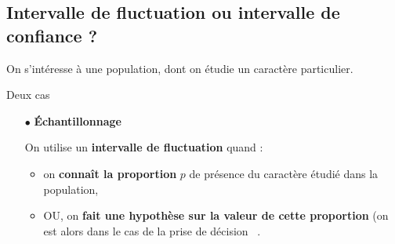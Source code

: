 \documentclass[12pt,french]{article}
\begin{document}
\begin{spacing}{1.2}
\begin{enumerate}
\begin{center}
\end{center}

\medskip

\begin{minipage}{0.9\linewidth}
\begin{alterqcm}
\end{alterqcm}
\end{minipage}


\begin{minipage}{0.95\linewidth}
\begin{alterqcm}[VF,lq=125mm,correction,
symb = \dingsquare,
corsymb = \dingchecksquare]
\AQquestion[br=1]{Pour tout $x \in ]-3~;~2],~f'(x) \geqslant 0$.}
\end{alterqcm}
\end{minipage}

\end{enumerate}
\newpage
\subsection{Intervalle de fluctuation ou intervalle de confiance ?}



On s'intéresse à une population, dont on étudie un caractère particulier.

\medskip

\begin{bclogo}[couleur = gray!30 , arrondi = 0.1 ,logo = \bclampe , barre = snake , tailleOndu = 1.5]{Deux cas}
\begin{itemize}
\item[$\bullet$] \textbf{\'Echantillonnage}

On utilise un \textbf{intervalle de fluctuation} quand :
	\begin{itemize}
	\item on \textbf{connaît la proportion} $p$ de présence du caractère étudié dans la population,
	\item OU, on \textbf{fait une hypothèse sur la valeur de cette proportion} (on est alors dans le cas de la \og prise de décision\fg~ .
	\end{itemize}


\end{itemize}
\end{bclogo}
\end{spacing}
\end{document}
